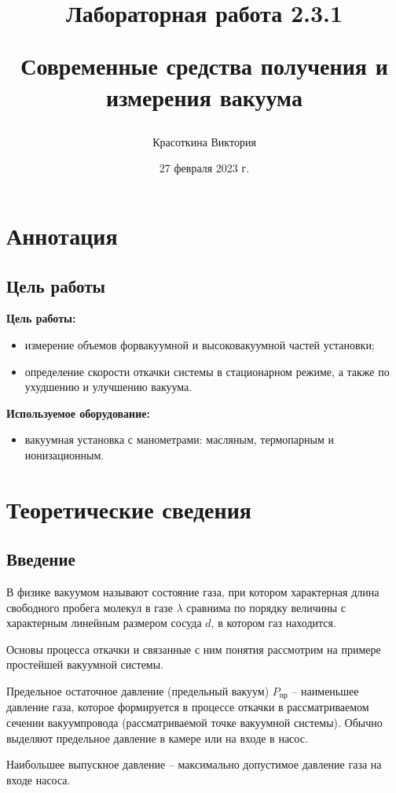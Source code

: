 \documentclass[a4paper,12pt]{article}
\author{Красоткина Виктория}
\title{Лабораторная работа 2.3.1

Современные средства получения и измерения вакуума}
\date{27 февраля 2023 г.}
\begin{document}
\maketitle
\thispagestyle{empty}

\newpage
\setcounter{page}{1}

\section{Аннотация}
\subsection{Цель работы}

\textbf{Цель работы:}
\begin{itemize}
	\item измерение объемов форвакуумной и высоковакуумной частей установки;
	\item определение скорости откачки системы в стационарном режиме, а также по ухудшению и улучшению вакуума.
\end{itemize}

\textbf{Используемое оборудование:} 
\begin{itemize}
	\item вакуумная установка с манометрами: масляным, термопарным и ионизационным.
\end{itemize}

\section{Теоретические сведения}
\subsection{Введение}

В физике вакуумом называют состояние газа, при котором характерная длина свободного пробега молекул в газе $\lambda$ сравнима по порядку
величины с характерным линейным размером сосуда $d$, в котором газ
находится.

Основы процесса откачки и связанные с ним понятия рассмотрим
на примере простейшей вакуумной системы.

Предельное остаточное давление (предельный вакуум) $P_{\text{пр}}$ -- наименьшее давление газа, которое формируется в процессе откачки в рассматриваемом сечении вакуумпровода (рассматриваемой точке вакуумной системы). Обычно выделяют предельное давление в
камере или на входе в насос.

Наибольшее выпускное давление -- максимально допустимое давление газа на входе насоса.
\end{document}
